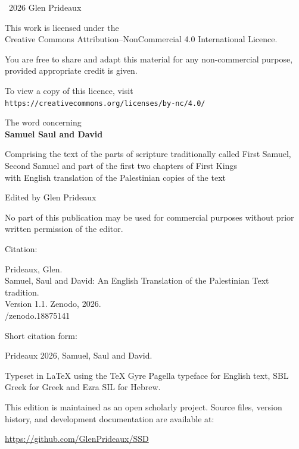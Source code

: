 \clearpage
\thispagestyle{empty}
\vspace*{\fill}

\small
\textcopyright\ 2026 Glen Prideaux

\vspace{1em}

This work is licensed under the\\
Creative Commons Attribution–NonCommercial 4.0 International Licence.

\vspace{1em}

You are free to share and adapt this material for any non-commercial purpose,
provided appropriate credit is given.

\vspace{1em}

To view a copy of this licence, visit\\
\texttt{https://creativecommons.org/licenses/by-nc/4.0/}

\vspace{2em}
The word concerning\\
\textbf{Samuel Saul and David}

Comprising the text of the parts of scripture traditionally called First
Samuel,\\
Second Samuel and part of the first two chapters of First Kings\\
with
English translation of the Palestinian copies of the text

\vspace{1em}

Edited by Glen Prideaux

\vspace{2em}

No part of this publication may be used for commercial purposes
without prior written permission of the editor.

{
\setlength{\parindent}{1cm}%
\noindent Citation:\par
\indent Prideaux, Glen.\\
\indent Samuel, Saul and David: An English Translation of the Palestinian Text tradition.\\
\indent Version 1.1. Zenodo, 2026.\\
/zenodo.18875141

\noindent Short citation form:\par
\indent Prideaux 2026, Samuel, Saul and David.
}

\vspace{2em}

Typeset in \LaTeX{} using the \TeX{} Gyre Pagella typeface for English
text, SBL Greek for Greek and Ezra SIL for Hebrew.

This edition is maintained as an open scholarly project.
Source files, version history, and development documentation are available at:

\href{https://github.com/GlenPrideaux/SSD}{https://github.com/GlenPrideaux/SSD}

